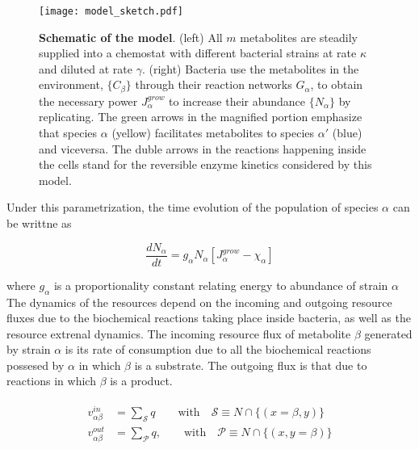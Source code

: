 \documentclass[titlepage,11pt]{article}
\begin{document}
\begin{linenumbers}
				\begin{figure}[t]
				\centering
				\texttt{[image: model\_sketch.pdf]}
				\caption{\textbf{Schematic of the model}. (left) All $ m $ metabolites are steadily supplied into a chemostat with different bacterial strains at rate $ \kappa $ and diluted at rate $ \gamma $. (right) Bacteria use the metabolites in the environment, $ \{C_{\beta}\} $ through their reaction networks $ G_{\alpha} $, to obtain the necessary power $ J_{\alpha}^{grow} $ to increase their abundance $ \{N_{\alpha}\} $ by replicating. The green arrows in the magnified portion emphasize that species $ \alpha $ (yellow) facilitates metabolites to species $ \alpha' $ (blue) and viceversa. The duble arrows in the reactions happening inside the cells stand for the reversible enzyme kinetics considered by this model.}
				\label{fig:model}
			\end{figure} 
			Under this parametrization, the time evolution of the population of species $ \alpha $ can be writtne as
			\begin{linenomath*}	
			\begin{equation}\label{eq:dNdt}
				\dfrac{dN_{\alpha}}{dt} = g_{\alpha}N_{\alpha}\left[J_{\alpha}^{grow}-\chi_{\alpha}\right] 
			\end{equation}
			\end{linenomath*}
			where $ g_{\alpha} $ is a proportionality constant relating energy to abundance of strain $ \alpha $\\
			The dynamics of the resources depend on the incoming and outgoing resource fluxes due to the biochemical reactions taking place inside bacteria, as well as the resource extrenal dynamics. The incoming resource flux of metabolite $ \beta $  generated by strain $ \alpha $ is its rate of consumption due to all the biochemical reactions possesed by $ \alpha $ in which $ \beta $ is a substrate. The outgoing flux is that due to reactions in which $ \beta $ is a product.
			\begin{linenomath*}	
			\begin{align}
			\begin{split}
				v^{in}_{\alpha \beta} &= \sum_{\mathcal{S}} q   \qquad \textrm{with}  \quad  \mathcal{S} \equiv N \cap \{(x = \beta, y)\}\\
				v^{out}_{\alpha \beta} &= \sum_{\mathcal{P}} q , \qquad \textrm{with}  \quad  \mathcal{P} \equiv N \cap \{(x, y = \beta )\}
			\end{split}
			\end{align}
			\end{linenomath*}

\end{linenumbers}
\end{document}
